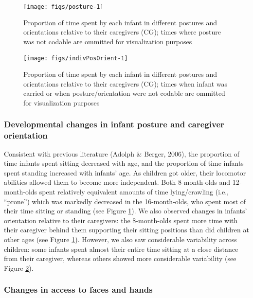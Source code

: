 \documentclass[english,man]{apa6}
\begin{document}
\begin{figure}[H]
\texttt{[image: figs/posture-1]} \caption{Proportion of time spent by each infant in different postures and orientations relative to their caregivers (CG); times where posture was not codable are ommitted for visualization purposes}\label{fig:posture}
\end{figure}

\begin{figure}[H]
\texttt{[image: figs/indivPosOrient-1]} \caption{Proportion of time spent by each infant in different postures and orientations relative to their caregivers (CG); times when infant was carried or when posture/orientation were not codable are ommitted for visualization purposes}\label{fig:indivPosOrient}
\end{figure}

\subsubsection{Developmental changes in infant posture and caregiver
orientation}\label{developmental-changes-in-infant-posture-and-caregiver-orientation}

Consistent with previous literature (Adolph \& Berger, 2006), the
proportion of time infants spent sitting decreased with age, and the
proportion of time infants spent standing increased with infants' age.
As children got older, their locomotor abilities allowed them to become
more independent. Both 8-month-olds and 12-month-olds spent relatively
equivalent amounts of time lying/crawling (i.e., \enquote{prone}) which
was markedly decreased in the 16-month-olds, who spent most of their
time sitting or standing (see Figure \ref{fig:posture}). We also
observed changes in infants' orientation relative to their caregivers:
the 8-month-olds spent more time with their caregiver behind them
supporting their sitting positions than did children at other ages (see
Figure \ref{fig:posture}). However, we also saw considerable variability
across children: some infants spent almost their entire time sitting at
a close distance from their caregiver, whereas others showed more
considerable variability (see Figure \ref{fig:indivPosOrient}).

\subsubsection{Changes in access to faces and
hands}\label{changes-in-access-to-faces-and-hands}
\end{document}
